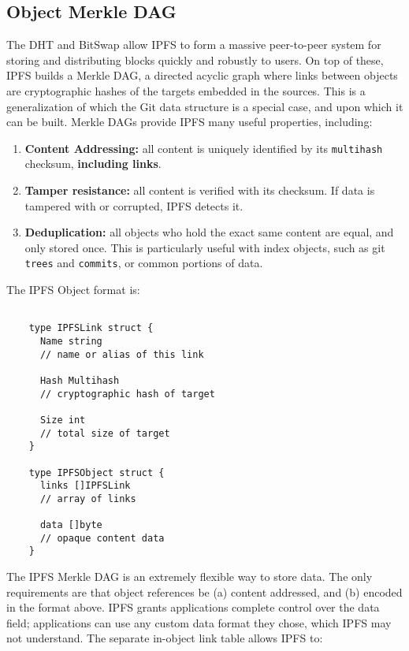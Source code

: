\documentclass{sig-alternate}
\begin{document}

\subsection{Object Merkle DAG}

The DHT and BitSwap allow IPFS to form a massive peer-to-peer system for storing and distributing blocks quickly and robustly to users. On top of these, IPFS builds a Merkle DAG, a directed acyclic graph where links between objects are cryptographic hashes of the targets embedded in the sources. This is a generalization of which the Git data structure is a special case, and upon which it can be built. Merkle DAGs provide IPFS many useful properties, including:

\begin{enumerate}
  \item \textbf{Content Addressing:} all content is uniquely identified by its
        \texttt{multihash} checksum, \textbf{including links}.
  \item \textbf{Tamper resistance:} all content is verified with its checksum.
        If data is tampered with or corrupted, IPFS detects it.
  \item \textbf{Deduplication:} all objects who hold the exact same content
        are equal, and only stored once. This is particularly useful with
        index objects, such as git \texttt{trees} and \texttt{commits}, or common portions of data.
\end{enumerate}

The IPFS Object format is:

\begin{verbatim}

    type IPFSLink struct {
      Name string
      // name or alias of this link

      Hash Multihash
      // cryptographic hash of target

      Size int
      // total size of target
    }

    type IPFSObject struct {
      links []IPFSLink
      // array of links

      data []byte
      // opaque content data
    }

\end{verbatim}


The IPFS Merkle DAG is an extremely flexible way to store data. The only requirements are that object references be (a) content addressed, and (b) encoded in the format above. IPFS grants applications complete control over the data field; applications can use any custom data format they chose, which IPFS may not understand. The separate in-object link table allows IPFS to:
\end{document}
